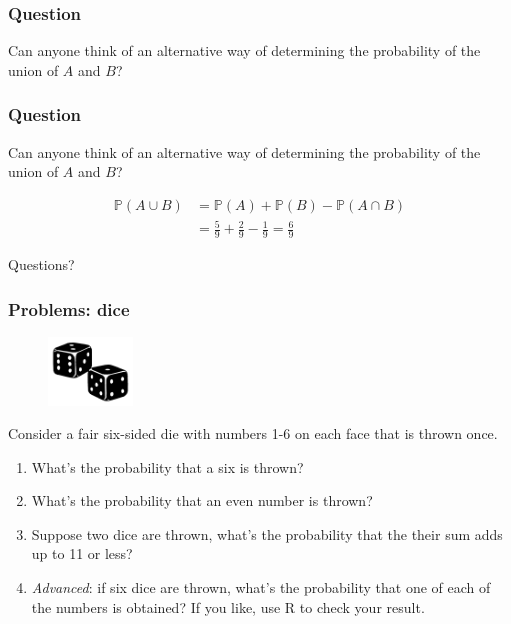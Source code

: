 \documentclass{beamer}
\begin{document}
	\begin{frame}
		\frametitle{Question}
		
		\Large Can anyone think of an alternative way of determining the probability of the union of $A$ and $B$?
		
	\end{frame}

	\begin{frame}
		\frametitle{Question}
		
		\Large Can anyone think of an alternative way of determining the probability of the union of $A$ and $B$?
		
		\begin{align}
			\mathbb{P}(A \cup B) &= \mathbb{P}(A) + \mathbb{P}(B) - \mathbb{P}(A \cap B)\\
			&= \frac{5}{9} + \frac{2}{9} - \frac{1}{9} = \frac{6}{9}
		\end{align}
		
		
	\end{frame}
	
	
	\begin{frame}
		\Large Questions?
	\end{frame}
	
	
	\begin{frame}
		\frametitle{Problems: dice}
		
		\begin{figure}[ht]
			\centerline{\includegraphics[width=0.2\textwidth]{./figures/dice.png}}
		\end{figure}
	
	Consider a fair six-sided die with numbers 1-6 on each face that is thrown once.
		
		\begin{enumerate}
			\item What's the probability that a six is thrown?
			\item What's the probability that an even number is thrown?
			\item Suppose two dice are thrown, what's the probability that the their sum adds up to 11 or less?
			\item \textit{Advanced}: if six dice are thrown, what's the probability that one of each of the numbers is obtained? If you like, use R to check your result.
		\end{enumerate}
		
	\end{frame}
\end{document}
